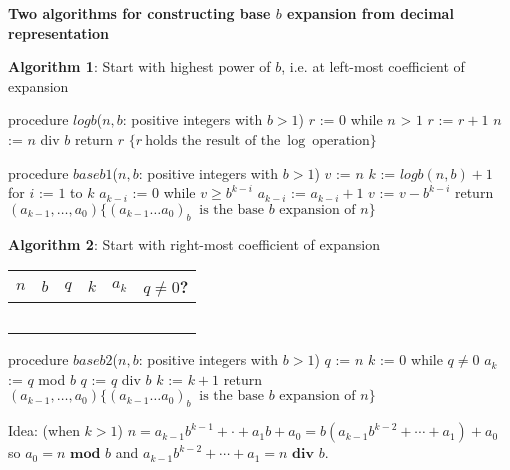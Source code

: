 
{\bf Two algorithms for constructing base $b$ expansion from decimal representation}

{\bf Algorithm 1}: Start with highest power of $b$, i.e. at left-most coefficient of expansion
\begin{multicols}{2}
\begin{algorithm}[caption={Calculating integer part of $\log_b$}]
procedure $\textit{logb}$($n, b$: positive integers with $b > 1$)
$r$ := $0$
while $n$ > $1$
  $r$ := $r + 1$
  $n$ := $n$ div $b$
return $r$ $\{ r~\textrm{holds the result of the}~\log~\textrm{operation}\}$
\end{algorithm}
\columnbreak
\begin{algorithm}[caption={Calculating base $b$ expansion, from left}]
procedure $\textit{baseb1}$($n, b$: positive integers with $b > 1$)
$v$ := $n$
$k$ := $logb(n,b) + 1$
for $i$ := $1$ to $k$
  $a_{k-i}$ := $0$
  while $v \geq b^{k-i}$
    $a_{k-i}$ := $a_{k-i} + 1$
    $v$ := $v -  b^{k-i}$
return $(a_{k-1}, \ldots, a_0) \{(a_{k-1} \ldots a_0)_b~\textrm{ is the base } b \textrm{ expansion of } n \}$
\end{algorithm}
\end{multicols}

{\bf Algorithm 2}: Start with right-most coefficient of expansion

\begin{multicols}{2}
\begin{minipage}{3.2in}
\begin{tabular}{c|c|c|c|c|c}
$n$ & $b$  & $q$ & $k$ & $a_k$ & $q \neq 0$?\\
\hline 
\phantom{~$17$~} & \phantom{~$3$~} & \phantom{~$17$~} & \phantom{~$0$~} & \phantom{~~~} & \phantom{~T~}\\
\phantom{~$17$~} & \phantom{~$3$~} & \phantom{~$5$~} & \phantom{~$1$~} & \phantom{~$a_0 = 2$~} & \phantom{~T~}\\
\phantom{~$17$~} & \phantom{~$3$~} & \phantom{~$1$~} & \phantom{~$2$~} & \phantom{~$a_1 = 2$~} & \phantom{~T~}\\
\phantom{~$17$~} & \phantom{~$3$~} & \phantom{~$0$~} & \phantom{~$3$~} & \phantom{~$a_2 = 1$~} & \phantom{~F~}\\
&&&&&\\
\end{tabular}
\end{minipage}
\columnbreak
\begin{algorithm}[caption={Calculating base $b$ expansion, from right}]
procedure $\textit{baseb2}$($n, b$: positive integers with $b > 1$)
$q$ := $n$
$k$ := $0$
while $q  \neq 0$
  $a_{k}$ := $q$ mod $b$
  $q$ := $q$ div $b$
  $k$ := $k+1$
return $(a_{k-1}, \ldots, a_0) \{(a_{k-1} \ldots a_0)_b~\textrm{ is the base } b \textrm{ expansion of } n \}$
\end{algorithm}

Idea: {\tiny(when $k > 1$)} $n = a_{k-1} b^{k-1} + \cdot+ a_1 b + a_0 = b ( a_{k-1} b^{k-2} + \cdots + a_1) + a_0$
so $a_0 = n \textbf{ mod } b$ and $a_{k-1} b^{k-2} + \cdots + a_1 = n \textbf{ div } b$.
\end{multicols}


